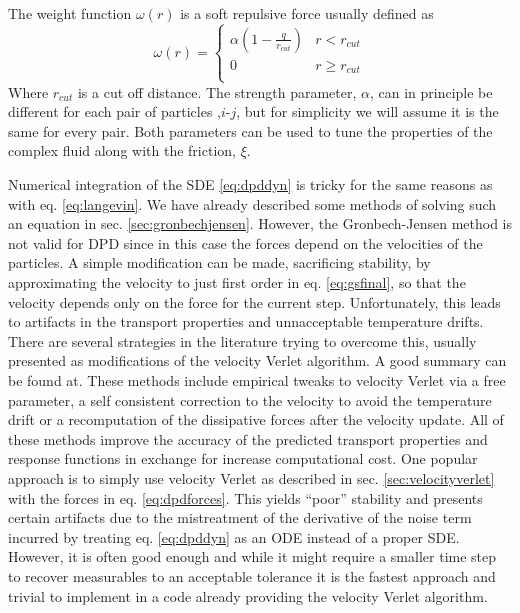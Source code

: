 \documentclass[ twoside,openright,titlepage,numbers=noenddot,%
headinclude,footinclude,cleardoublepage=empty,abstract=on,
BCOR=5mm,paper=a4,fontsize=11pt, dvipsnames
]{scrreprt}
\newcommand{\ppos}{q}
\begin{document}
The weight function $\omega(r)$ is a soft repulsive force usually defined as
\begin{equation}
  \label{eq:dpdw}
  \omega(r) =
  \begin{cases}
    \alpha\left(1-\frac{\ppos}{r_{cut}}\right) & r<r_{cut}\\
    0 & r\ge r_{cut}\\                                    
  \end{cases}
\end{equation}
Where $r_{cut}$ is a cut off distance. The strength parameter, $\alpha$, can in principle be different for each pair of particles ,$i$-$j$, but for simplicity we will assume it is the same for every pair. Both parameters can be used to tune the properties of the complex fluid along with the friction, $\xi$.

Numerical integration of the \gls{SDE} \eqref{eq:dpddyn} is tricky for the same reasons as with eq. \eqref{eq:langevin}. We have already described some methods of solving such an equation in sec. \ref{sec:gronbechjensen}. However, the Gronbech-Jensen method is not valid for \gls{DPD} since in this case the forces depend on the velocities of the particles. A simple modification can be made, sacrificing stability, by approximating the velocity to just first order in eq. \eqref{eq:gsfinal}, so that the velocity depends only on the force for the current step. Unfortunately, this leads to artifacts in the transport properties and unnacceptable temperature drifts. There are several strategies in the literature trying to overcome this, usually presented as modifications of the velocity Verlet algorithm. A good summary can be found at\cite{Leimhuler2015}. These methods include empirical tweaks to velocity Verlet via a free parameter\cite{Groot1997}, a self consistent correction to the velocity to avoid the temperature drift\cite{Pagonabarraga1998} or a recomputation of the dissipative forces after the velocity update\cite{Besold2000}.
All of these methods improve the accuracy of the predicted transport properties and response functions in exchange for increase computational cost. 
One popular approach is to simply use velocity Verlet as described in sec. \ref{sec:velocityverlet} with the forces in eq. \eqref{eq:dpdforces}. This yields ``poor'' stability and presents certain artifacts\cite{Besold2000} due to the mistreatment of the derivative of the noise term incurred by treating eq. \eqref{eq:dpddyn} as an \gls{ODE} instead of a proper \gls{SDE}. However, it is often good enough and while it might require a smaller time step to recover measurables to an acceptable tolerance it is the fastest approach and trivial to implement in a code already providing the velocity Verlet algorithm.
\end{document}
